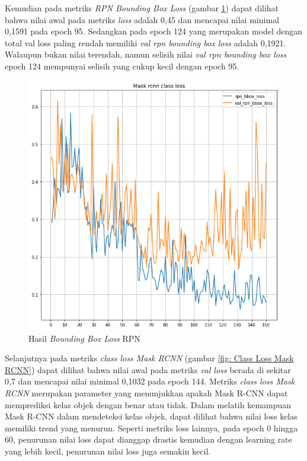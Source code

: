 Kemudian pada metriks \textit{RPN Bounding Box Loss} (gambar \ref{fig: RPN Bounding Box Loss Mask RCNN})
dapat dilihat bahwa nilai awal pada metriks \textit{loss} adalah 0,45 dan mencapai nilai minimal 0,1591
pada epoch 95. Sedangkan pada epoch 124 yang merupakan model dengan total val loss paling rendah memiliki \textit{val rpn bounding box loss} adalah 0,1921. 
Walaupun bukan nilai terendah, namun selisih nilai \textit{val rpn bounding box loss} epoch 124 mempunyai selisih
yang cukup kecil dengan epoch 95.

\begin{figure}[h!]
  \begin{center}
    \includegraphics[width= 0.55\linewidth]{bab4/6. RPN_Bbox_Loss.png}
    \caption{Hasil \textit{Bounding Box Loss} RPN}
    \label{fig: RPN Bounding Box Loss Mask RCNN}
  \end{center}
\end{figure}

Selanjutnya pada metriks \textit{class loss Mask RCNN} (gambar \ref{fig: Class Loss Mask RCNN})
dapat dilihat bahwa nilai awal pada metriks \textit{val loss} berada di sekitar 0,7 dan mencapai nilai minimal 0,1032
pada epoch 144. Metriks \textit{class loss Mask RCNN} merupakan parameter yang menunjukkan apakah
Mask R-CNN dapat memprediksi kelas objek dengan benar atau tidak. Dalam melatih kemampuan Mask R-CNN
dalam mendeteksi kelas objek, dapat dilihat bahwa nilai loss kelas memiliki trend yang menurun. Seperti
metriks loss lainnya, pada epoch 0 hingga 60, penurunan nilai loss dapat dianggap drastis kemudian
dengan learning rate yang lebih kecil, penurunan nilai loss juga semakin kecil.

